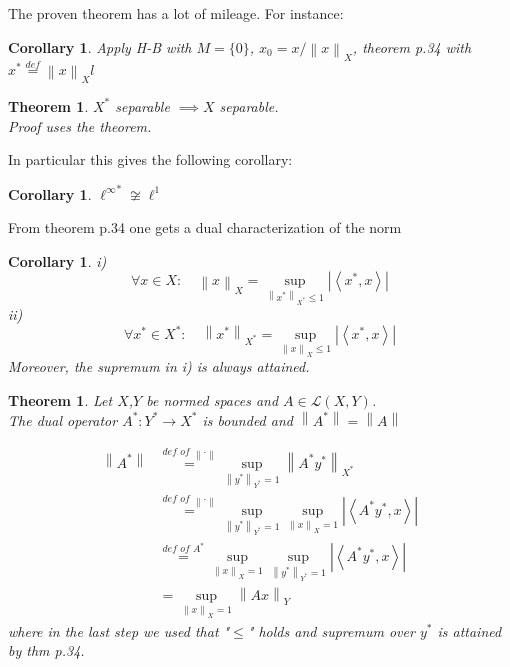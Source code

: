 \documentclass{article}
\newcommand{\nextline}{\hfill\break}
\newcommand{\inne}[2]{\left<{#1},{#2}\right>}
\newcommand{\norm}[1]{\left\|{#1}\right\|}
\newcommand{\dual}[1]{{#1}^*}
\newcommand{\func}[3]{${#1}:{#2}\xrightarrow{}{#3}$}
\newtheorem{theorem}[example]{Theorem}
\newtheorem{corollary}[example]{Corollary}
\begin{document}
    The proven theorem has a lot of mileage. For instance:
    \begin{corollary}\rm\nextline
        Apply H-B with $M=\{0\}$, $x_0=x/{\norm{x}_X}$, theorem p.34 with $\dual x\stackrel{def}{=}\norm{x}_Xl$
    \end{corollary}

        \begin{theorem}\rm\nextline
            $\dual X$ separable $\implies X$ separable.
            \\
            Proof uses the theorem.
        \end{theorem}
In particular this gives the following corollary:
\begin{corollary}\rm\nextline
    $\dual{\ell^\infty}\not\cong \ell^1$
\end{corollary}
From theorem p.34 one gets a dual characterization of the norm
\begin{corollary}\rm\nextline
    i) 
    $$
    \forall x\in X:\quad\norm{x}_X=\sup_{\norm{\dual x}_{\dual X}\leq1}|\inne{\dual x}{x}|
    $$
     ii) 
     $$
     \forall {\dual x}\in {\dual X}:\quad\norm{{\dual x}}_{\dual X}=\sup_{\norm{x}_{X}\leq1}|\inne{\dual x}{x}|$$
Moreover, the supremum in i) is always attained.
\begin{pf}{}{}
    
\end{pf}

\end{corollary}

\begin{theorem}\rm\nextline
    Let $X$,$Y$ be normed spaces and $A \in \mathcal{L}(X,Y)$.\\ The dual operator \func{\dual A}{\dual Y}{\dual X} is bounded and $\norm{\dual A}=\norm{A}$
    \begin{pf}{}{}
        \begin{equation}
            \begin{split}
                \norm{\dual A}&\stackrel{\textit{def of } \norm{\cdot}}{=}\sup_{\norm{\dual y}_{\dual Y}=1}\norm{\dual A\dual y}_{\dual X}\\
                &\stackrel{\textit{def of }\norm{\cdot}}{=}\sup_{\norm{\dual y}_{\dual Y}=1}\sup_{\norm{x}_X=1}|\inne{\dual A\dual y}{x}|\\
                &\stackrel{\textit{def of }\dual A}{=}\sup_{\norm{x}_X=1}\sup_{\norm{\dual y}_{\dual Y}=1}|\inne{\dual A\dual y}{x}|\\
                &=\sup_{\norm{x}_X=1}\norm{Ax}_Y
            \end{split}
        \end{equation}
        where in the last step we used  that "$\leq$" holds and supremum over $\dual y$ is attained by thm p.34.
    \end{pf}
\end{theorem}
\end{document}
